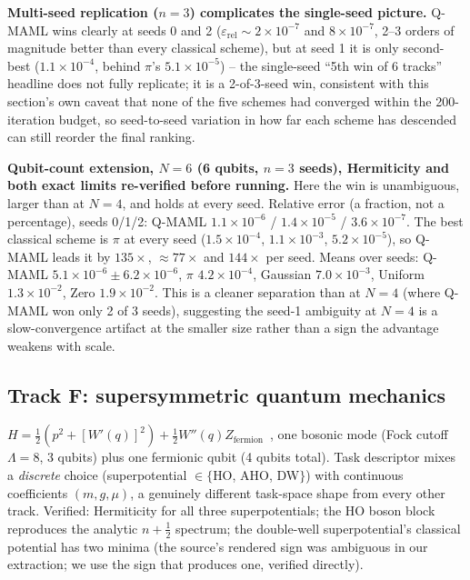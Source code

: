 \documentclass[11pt]{article}
\begin{document}
\begin{keyresult}
\textbf{Multi-seed replication ($n{=}3$) complicates the single-seed picture.} Q-MAML wins clearly at seeds
0 and 2 ($\varepsilon_{\mathrm{rel}}\sim2\times10^{-7}$ and $8\times10^{-7}$, 2--3 orders of magnitude
better than every classical scheme), but at seed 1 it is only second-best ($1.1\times10^{-4}$, behind
$\pi$'s $5.1\times10^{-5}$) -- the single-seed ``5th win of 6 tracks'' headline does not fully replicate; it
is a 2-of-3-seed win, consistent with this section's own caveat that none of the five schemes had converged
within the 200-iteration budget, so seed-to-seed variation in how far each scheme has descended can still
reorder the final ranking.

\textbf{Qubit-count extension, $N{=}6$ (6 qubits, $n{=}3$ seeds), Hermiticity and both exact limits
re-verified before running.} Here the win is unambiguous, larger than at $N{=}4$, and holds at every seed.
Relative error (a fraction, not a percentage), seeds 0/1/2: Q-MAML $1.1\times10^{-6}$ / $1.4\times10^{-5}$ /
$3.6\times10^{-7}$. The best classical scheme is $\pi$ at every seed ($1.5\times10^{-4}$, $1.1\times10^{-3}$,
$5.2\times10^{-5}$), so Q-MAML leads it by $135\times$, $\approx77\times$ and $144\times$ per seed. Means over seeds:
Q-MAML $5.1\times10^{-6}\pm6.2\times10^{-6}$, $\pi$ $4.2\times10^{-4}$, Gaussian $7.0\times10^{-3}$, Uniform
$1.3\times10^{-2}$, Zero $1.9\times10^{-2}$. This is a cleaner separation than at $N{=}4$ (where Q-MAML won only
2 of 3 seeds), suggesting the seed-1 ambiguity at $N{=}4$ is a slow-convergence artifact at the smaller size
rather than a sign the advantage weakens with scale.
\end{keyresult}

\FloatBarrier
\subsection{Track F: supersymmetric quantum mechanics}
\label{sec:track-f}
$H=\frac12(p^2+[W'(q)]^2)+\frac12 W''(q)Z_{\text{fermion}}$~\citep{susyqm2026}, one bosonic mode (Fock
cutoff $\Lambda{=}8$, 3 qubits) plus one fermionic qubit (4 qubits total). Task descriptor mixes a
\emph{discrete} choice (superpotential $\in\{$HO, AHO, DW$\}$) with continuous coefficients $(m,g,\mu)$, a
genuinely different task-space shape from every other track. Verified: Hermiticity for all three
superpotentials; the HO boson block reproduces the analytic $n+\tfrac12$ spectrum; the double-well
superpotential's classical potential has two minima (the source's rendered sign was ambiguous in our
extraction; we use the sign that produces one, verified directly).
\end{document}
